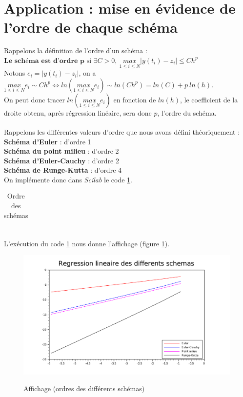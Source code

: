 \documentclass[a4paper,10pt]{report}
\begin{document}
\section{Application : mise en évidence de l'ordre de chaque schéma}
Rappelons la définition de l'ordre d'un schéma :\\
$\textbf{Le schéma est d'ordre p} \text{ si } \exists C > 0, \ \underset{1\leq i \leq N}{max} |y(t_i)-z_i| \leq Ch^p $\\
Notons $e_i=|y(t_i)-z_i|$, on a $\underset{1\leq i \leq N}{max}e_i \sim Ch^p \Leftrightarrow ln(\underset{1\leq i \leq N}{max}e_i) \sim ln(Ch^p) = ln(C) + p\ ln(h)$.\\
On peut donc tracer $ln(\underset{1\leq i \leq N}{max}e_i)$ en fonction de $ln(h)$, le coefficient de la droite obtenu, après régression linéaire, sera donc $p$, l'ordre du schéma.\\ \\
Rappelons les différentes valeurs d'ordre que nous avons défini théoriquement :\\
\textbf{Schéma d'Euler} : d'ordre 1\\
\textbf{Schéma du point milieu} : d'ordre 2\\
\textbf{Schéma d'Euler-Cauchy} : d'ordre 2\\
\textbf{Schéma de Runge-Kutta} : d'ordre 4\\

On implémente donc dans \textit{Scilab} le code \ref{code_ordre}.
\begin{table}[H]
\caption{Ordre des schémas}
\begin{tabular}{l}

\label{code_ordre}
\end{tabular}
\end{table}

\begin{table}[H]
\begin{tabular}{l}

\end{tabular}
\end{table}

L'exécution du code \ref{code_ordre} nous donne l'affichage (figure \ref{graph_ordre}).
\begin{figure}[H]
\centering
\caption{Affichage (ordres des différents schémas)}
\includegraphics[width=\textwidth]{ordre.pdf}
\label{graph_ordre}
\end{figure}
\end{document}
